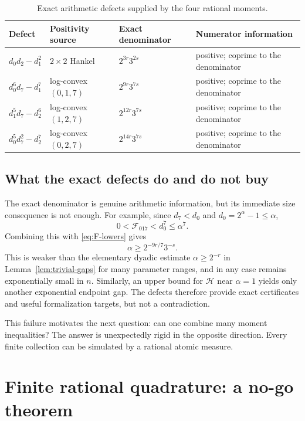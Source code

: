 \documentclass[11pt,oneside]{article}
\theoremstyle{definition}
\theoremstyle{remark}
\begin{document}
\begin{table}[htbp]
\centering
\caption{Exact arithmetic defects supplied by the four rational moments.}
\label{tab:defects}
\small
\begin{tabularx}{\textwidth}{@{}l l l X@{}}
\toprule
Defect & Positivity source & Exact denominator & Numerator information\\
\midrule
$d_0d_2-d_1^2$
& $2\times2$ Hankel
& $2^{3r}3^{2s}$
& positive; coprime to the denominator\\
$d_0^6d_7-d_1^7$
& log-convex $(0,1,7)$
& $2^{9r}3^{7s}$
& positive; coprime to the denominator\\
$d_1^5d_7-d_2^6$
& log-convex $(1,2,7)$
& $2^{12r}3^{7s}$
& positive; coprime to the denominator\\
$d_0^5d_7^2-d_2^7$
& log-convex $(0,2,7)$
& $2^{14r}3^{7s}$
& positive; coprime to the denominator\\
\bottomrule
\end{tabularx}
\end{table}

\subsection{What the exact defects do and do not buy}

The exact denominator is genuine arithmetic information, but its immediate size consequence is
not enough.  For example, since $d_7<d_0$ and $d_0=2^\alpha-1\le\alpha$,
\[
 0<\mathcal F_{017}<d_0^7\le\alpha^7.
\]
Combining this with \eqref{eq:F-lowers} gives
\begin{equation}\label{eq:F-alpha-gap}
 \alpha\ge2^{-9r/7}3^{-s}.
\end{equation}
This is weaker than the elementary dyadic estimate $\alpha\ge2^{-r}$ in
Lemma~\ref{lem:trivial-gaps} for many parameter ranges, and in any case remains exponentially
small in $n$.  Similarly, an upper bound for $\mathcal H$ near $\alpha=1$ yields only another
exponential endpoint gap.  The defects therefore provide exact certificates and useful
formalization targets, but not a contradiction.

This failure motivates the next question: can one combine many moment inequalities?  The
answer is unexpectedly rigid in the opposite direction.  Every finite collection can be
simulated by a rational atomic measure.

\section{Finite rational quadrature: a no-go theorem}
\end{document}
